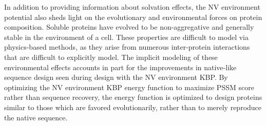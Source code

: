 In addition to providing information about solvation effects, the NV environment potential also sheds light on the evolutionary and environmental forces on protein composition.
Soluble proteins have evolved to be non-aggregative and generally stable in the environment of a cell.
These properties are difficult to model via physics-based methods, as they arise from numerous inter-protein interactions that are difficult to explicitly model.
The implicit modeling of these environmental effects accounts in part for the improvements in native-like sequence design seen during design with the NV environment KBP.
By optimizing the NV environment KBP energy function to maximize PSSM score rather than sequence recovery, the energy function is optimized to design proteins similar to those which are favored evolutionarily, rather than to merely reproduce the native sequence.